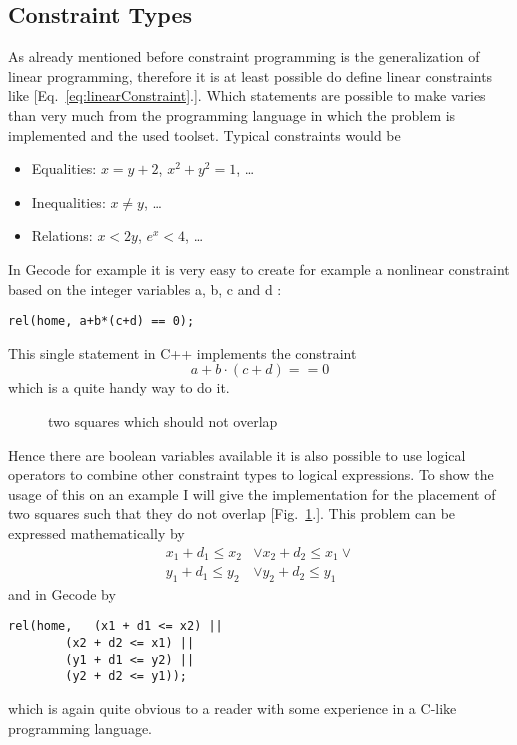 \documentclass[10pt,
               a4paper,
               journal,
               ]{IEEEtran}
\newcommand{\reffig}[1]{{[Fig.~\ref{#1}.]}}
\newcommand{\refeq}[1]{{[Eq.~\ref{#1}.]}}
\begin{document}
	\subsection{Constraint Types}
	As already mentioned before constraint programming is the generalization of linear programming, therefore it is at least possible do define linear constraints like \refeq{eq:linearConstraint}. Which statements are possible to make varies than very much from the programming language in which the problem is implemented and the used toolset. Typical constraints would be
	\begin{itemize}
		\item Equalities: $x = y + 2$, $x^2 + y^2 = 1$, \dots
		\item Inequalities: $x \ne y$, \dots
		\item Relations: $x < 2 y$, $e^x < 4$, \dots
	\end{itemize}
	In Gecode for example it is very easy to create for example a nonlinear constraint based on the integer variables a, b, c and d \cite[p.~120]{programmingGecode}:
	\begin{lstlisting}
rel(home, a+b*(c+d) == 0);
	\end{lstlisting}
	This single statement in C++ implements the constraint
	\begin{equation}
		a + b \cdot (c + d) == 0
	\end{equation}
	which is a quite handy way to do it.
	
	\begin{figure}
	\center
	\caption{two squares which should not overlap}
	\label{fig:squares}
	\end{figure}
	Hence there are boolean variables available it is also possible to use logical operators to combine other constraint types to logical expressions. To show the usage of this on an example I will give the implementation for the placement of two squares such that they do not overlap \reffig{fig:squares}. This problem can be expressed mathematically by \cite[p. 101]{programmingGecode}
	\begin{equation}
	\begin{split}
		x_1 + d_1 \le x_2 & \lor x_2 + d_2 \le x_1 \lor \\
		y_1 + d_1 \le y_2 & \lor y_2 + d_2 \le y_1
	\end{split}
	\end{equation}
	and in Gecode by
	\begin{lstlisting}
rel(home,	(x1 + d1 <= x2) || 
		(x2 + d2 <= x1) || 
		(y1 + d1 <= y2) || 
		(y2 + d2 <= y1));
	\end{lstlisting}
	which is again quite obvious to a reader with some experience in a C-like programming language.	
	
\end{document}
